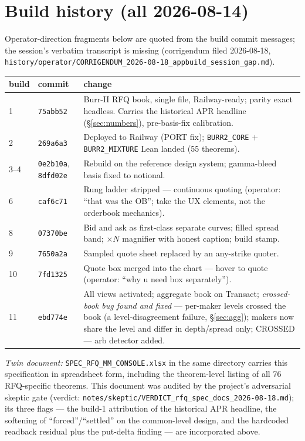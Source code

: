 \documentclass[11pt]{article}
\begin{document}
\appendix
\section{Build history (all 2026-08-14)}\label{app:builds}

Operator-direction fragments below are quoted from the build commit messages; the session's
verbatim transcript is missing (corrigendum filed 2026-08-18,
\texttt{history/operator/CORRIGENDUM\_2026-08-18\_appbuild\_session\_gap.md}).

\begin{center}\small
\begin{tabular}{llp{9.6cm}}
\toprule
build & commit & change \\
\midrule
1 & \texttt{75abb52} & Burr-II RFQ book, single file, Railway-ready; parity exact headless.
Carries the historical APR headline (\S\ref{sec:numbers}), pre-basis-fix calibration. \\
2 & \texttt{269a6a3} & Deployed to Railway (PORT fix); \texttt{BURR2\_CORE} $+$
\texttt{BURR2\_MIXTURE} Lean landed (55 theorems). \\
3--4 & \texttt{0e2b10a}, \texttt{8dfd02e} & Rebuild on the reference design system;
gamma-bleed basis fixed to notional. \\
6 & \texttt{caf6c71} & Rung ladder stripped --- continuous quoting (operator: ``that was the
OB''; take the UX elements, not the orderbook mechanics). \\
8 & \texttt{07370be} & Bid and ask as first-class separate curves; filled spread band;
$\times N$ magnifier with honest caption; build stamp. \\
9 & \texttt{7650a2a} & Sampled quote sheet replaced by an any-strike quoter. \\
10 & \texttt{7fd1325} & Quote box merged into the chart --- hover to quote (operator: ``why u
need box separately''). \\
11 & \texttt{ebd774e} & All views activated; aggregate book on Transact; \emph{crossed-book
bug found and fixed} --- per-maker levels crossed the book (a level-disagreement failure,
\S\ref{sec:agg}); makers now share the level and differ in depth/spread only;
\textsf{CROSSED --- arb} detector added. \\
\bottomrule
\end{tabular}
\end{center}

\medskip
\noindent\textit{Twin document: } \texttt{SPEC\_RFQ\_MM\_CONSOLE.xlsx} in the same directory
carries this specification in spreadsheet form, including the theorem-level listing of all 76
RFQ-specific theorems. This document was audited by the project's adversarial skeptic gate
(verdict: \texttt{notes/skeptic/VERDICT\_rfq\_spec\_docs\_2026-08-18.md}); its three flags ---
the build-1 attribution of the historical APR headline, the softening of ``forced''/``settled''
on the common-level design, and the hardcoded readback residual plus the put-delta finding ---
are incorporated above.
\end{document}
